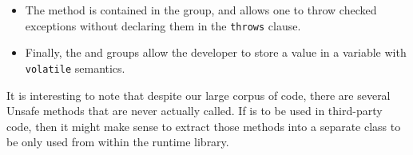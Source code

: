 \begin{itemize}
\item The  method is contained in the  group, and allows one to throw checked exceptions without declaring them in the \texttt{throws} clause.

\item Finally, the  and  groups allow the developer to store a value in a \java{} variable with \texttt{volatile} semantics.

\end{itemize}

It is interesting to note that despite our large corpus of code, there are several Unsafe methods that are never actually called. If \unsafe{} is to be used in third-party code, then it might make sense to extract those methods into a separate class to be only used from within the runtime library.

%
%
